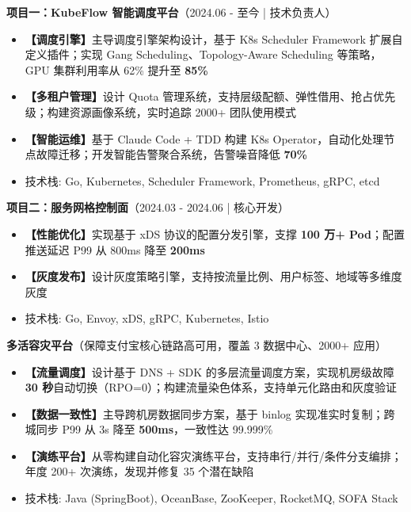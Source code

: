 \documentclass{resume}
\begin{document}
\textbf{项目一：KubeFlow 智能调度平台}（2024.06 - 至今 | 技术负责人）
\begin{itemize}[parsep=0.25ex]
      \item \textbf{【调度引擎】}主导调度引擎架构设计，基于 K8s Scheduler Framework 扩展自定义插件；实现 Gang Scheduling、Topology-Aware Scheduling 等策略，GPU 集群利用率从 62\% 提升至 \textbf{85\%}
      \item \textbf{【多租户管理】}设计 Quota 管理系统，支持层级配额、弹性借用、抢占优先级；构建资源画像系统，实时追踪 2000+ 团队使用模式
      \item \textbf{【智能运维】}基于 Claude Code + TDD 构建 K8s Operator，自动化处理节点故障迁移；开发智能告警聚合系统，告警噪音降低 \textbf{70\%}
      \item 技术栈: Go, Kubernetes, Scheduler Framework, Prometheus, gRPC, etcd
\end{itemize}

\textbf{项目二：服务网格控制面}（2024.03 - 2024.06 | 核心开发）
\begin{itemize}[parsep=0.25ex]
      \item \textbf{【性能优化】}实现基于 xDS 协议的配置分发引擎，支撑 \textbf{100 万+ Pod}；配置推送延迟 P99 从 800ms 降至 \textbf{200ms}
      \item \textbf{【灰度发布】}设计灰度策略引擎，支持按流量比例、用户标签、地域等多维度灰度
      \item 技术栈: Go, Envoy, xDS, gRPC, Kubernetes, Istio
\end{itemize}


\textbf{多活容灾平台}（保障支付宝核心链路高可用，覆盖 3 数据中心、2000+ 应用）
\begin{itemize}[parsep=0.25ex]
      \item \textbf{【流量调度】}设计基于 DNS + SDK 的多层流量调度方案，实现机房级故障 \textbf{30 秒}自动切换（RPO=0）；构建流量染色体系，支持单元化路由和灰度验证
      \item \textbf{【数据一致性】}主导跨机房数据同步方案，基于 binlog 实现准实时复制；跨城同步 P99 从 3s 降至 \textbf{500ms}，一致性达 99.999\%
      \item \textbf{【演练平台】}从零构建自动化容灾演练平台，支持串行/并行/条件分支编排；年度 200+ 次演练，发现并修复 35 个潜在缺陷
      \item 技术栈: Java (SpringBoot), OceanBase, ZooKeeper, RocketMQ, SOFA Stack
\end{itemize}
\end{document}
